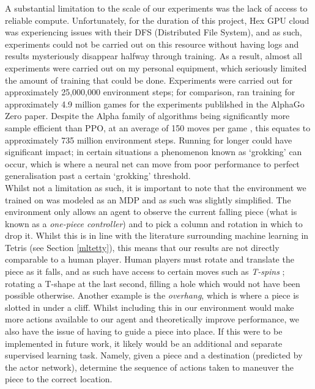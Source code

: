 \documentclass[12pt]{article}
\begin{document}
A substantial limitation to the scale of our experiments was the lack of access to reliable compute. Unfortunately, for the duration of this project, Hex GPU cloud was experiencing issues with their DFS (Distributed File System), and as such, experiments could not be carried out on this resource without having logs and results mysteriously disappear halfway through training. As a result, almost all experiments were carried out on my personal equipment, which seriously limited the amount of training that could be done. Experiments were carried out for approximately 25,000,000 environment steps; for comparison, \textcite{Silver2017} ran training for approximately 4.9 million games for the experiments publilshed in the AlphaGo Zero paper. Despite the Alpha family of algorithms being significantly more sample efficient than PPO, at an average of 150 moves per game \autocite{allis1994searching}, this equates to approximately 735 million environment steps. Running for longer could have significant impact; in certain situations a phenomenon known as `grokking' \autocite{DBLP:journals/corr/abs-2201-02177} can occur, which is where a neural net can move from poor performance to perfect generalisation past a certain `grokking' threshold.\\\newline
Whilst not a limitation as such, it is important to note that the environment we trained on was modeled as an MDP and as such was slightly simplified. The environment only allows an agent to observe the current falling piece (what is known as a \textit{one-piece controller}) and to pick a column and rotation in which to drop it. Whilst this is in line with the literature surrounding machine learning in Tetris (see Section \ref{mltetty}), this means that our results are not directly comparable to a human player. Human players must rotate and translate the piece as it falls, and as such have access to certain moves such as \textit{T-spins} \autocite{fahey}; rotating a T-shape at the last second, filling a hole which would not have been possible otherwise. Another example is the \textit{overhang}, which is where a piece is slotted in under a cliff. Whilst including this in our environment would make more actions available to our agent and theoretically improve performance, we also have the issue of having to guide a piece into place. If this were to be implemented in future work, it likely would be an additional and separate supervised learning task. Namely, given a piece and a destination (predicted by the actor network), determine the sequence of actions taken to maneuver the piece to the correct location. 
\end{document}
